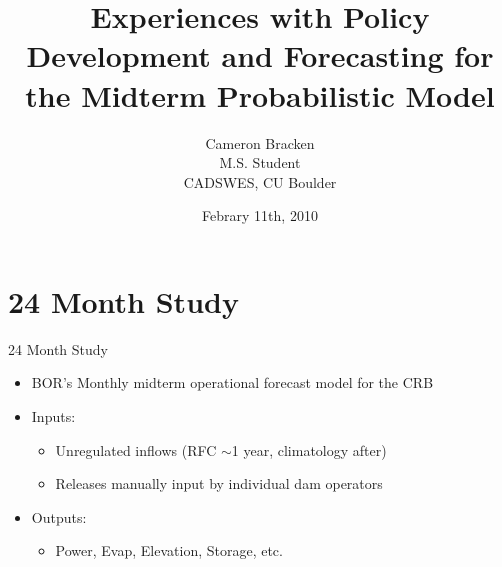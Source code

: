 \documentclass{beamer}
\title[\scshape Probabalistic Midterm Model]{Experiences with Policy Development and Forecasting for the Midterm Probabilistic Model}
\author[\it Cameron Bracken]{Cameron Bracken\\M.S. Student\\CADSWES, CU Boulder}
\date{Febrary 11th, 2010}
\begin{document}
\begin{frame}
\titlepage
\end{frame}

\section{24 Month Study}
\begin{frame}{24 Month Study}
\begin{itemize}
	\item BOR's Monthly midterm operational forecast model for the CRB
	\item Inputs: 
		\begin{itemize}
			\item Unregulated inflows (RFC $\sim$1 year, climatology after)
			\item Releases manually input by individual dam operators
		\end{itemize}
	\item Outputs: 
	\begin{itemize}
		\item Power, Evap, Elevation, Storage, etc. 
	\end{itemize}
\end{itemize}
\end{frame}

\end{document}
